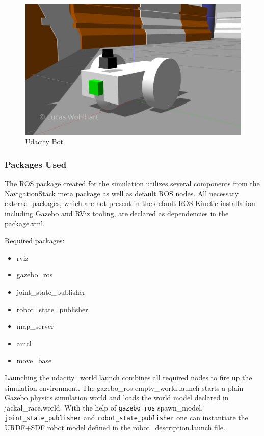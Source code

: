 \documentclass[10pt,journal,compsoc]{IEEEtran}
\begin{document}
\begin{figure}[thpb]
      \centering
      \includegraphics[width=\linewidth]{img/udacity_bot}
      \caption{Udacity Bot}
      \label{fig:udacity_bot}
\end{figure}

\subsubsection{Packages Used}
\label{sec:packages_udacity_bot}

The ROS package created for the simulation utilizes several components from the NavigationStack meta package as well as default ROS nodes. 
All necessary external packages, which are not present in the default ROS-Kinetic installation including Gazebo and RViz tooling, are declared as dependencies in the package.xml. 

Required packages:
\begin{itemize}
 \item rviz
 \item gazebo\_ros
 \item joint\_state\_publisher
 \item robot\_state\_publisher
 \item map\_server \cite{ROSNavMapServer} 
 \item amcl \cite{ROSNavAMCL}
 \item move\_base \cite{ROSNavMoveBase}
\end{itemize}

Launching the udacity\_world.launch combines all required nodes to fire up the simulation environment.
The gazebo\_ros empty\_world.launch starts a plain Gazebo physics simulation world and loads the world model declared in jackal\_race.world.
With the help of \texttt{gazebo\_ros} spawn\_model, \texttt{joint\_state\_publisher} and \texttt{robot\_state\_publisher} one can instantiate the URDF+SDF robot model defined in the robot\_description.launch file.
\end{document}
